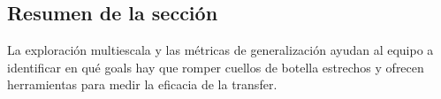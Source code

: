 \subsection{Resumen de la sección}
La exploración multiescala y las métricas de generalización ayudan al equipo a identificar en qué goals hay que romper cuellos de botella estrechos y ofrecen herramientas para medir la eficacia de la transfer.
\newpage
